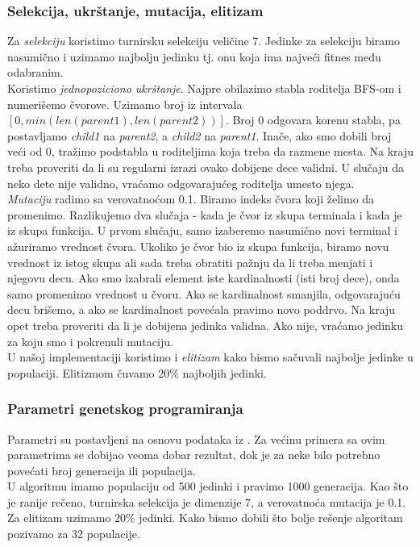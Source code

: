 \documentclass{article}
\begin{document}
\subsubsection{Selekcija, ukrštanje, mutacija, elitizam}
Za \textit{selekciju} koristimo turnirsku selekciju veličine 7. Jedinke
za selekciju biramo nasumično i uzimamo najbolju jedinku tj. onu koja ima najveći fitnes među odabranim. \\
Koristimo \textit{jednopoziciono ukrštanje}. Najpre obilazimo stabla roditelja BFS-om i numerišemo čvorove. Uzimamo broj iz intervala $[0, min(len(parent1), len(parent2))]$. Broj 0 odgovara korenu stabla, pa postavljamo \textit{child1} na \textit{parent2}, a \textit{child2} na \textit{parent1}. Inače, ako smo dobili broj veći od 0, tražimo podstabla u roditeljima koja treba da razmene mesta. Na kraju treba proveriti da li su regularni izrazi ovako dobijene dece validni. U slučaju da neko dete nije validno, vraćamo odgovarajućeg roditelja umesto njega. \\
\textit{Mutaciju} radimo sa verovatnoćom 0.1. Biramo indeks čvora koji želimo da promenimo. Razlikujemo dva slučaja - kada je čvor iz skupa terminala i kada je iz skupa funkcija. U prvom slučaju, samo izaberemo nasumično novi terminal i ažuriramo vrednost čvora.
Ukoliko je čvor bio iz skupa funkcija, biramo novu vrednost iz istog skupa ali sada treba obratiti pažnju da li treba menjati i njegovu decu. Ako smo izabrali element iste kardinalnosti (isti broj dece), onda samo promenimo vrednost u čvoru. Ako se kardinalnost smanjila, odgovarajuću decu brišemo, a ako se kardinalnost povećala pravimo novo poddrvo. Na kraju opet treba proveriti da li je dobijena jedinka validna. Ako nije, vraćamo jedinku za koju smo i pokrenuli mutaciju. \\
U našoj implementaciji koristimo i \textit{elitizam} kako bismo sačuvali najbolje jedinke u populaciji. Elitizmom čuvamo $20\%$ najboljih jedinki.

\subsubsection{Parametri genetskog programiranja}
Parametri su postavljeni na osnovu podataka iz \cite{Bartoli}. Za većinu primera sa ovim parametrima se dobijao veoma dobar rezultat, dok je za neke bilo potrebno povećati broj generacija ili populacija. \\
U algoritmu imamo populaciju od 500 jedinki i pravimo 1000 generacija.
Kao što je ranije rečeno, turnirska selekcija je dimenzije 7, a verovatnoća mutacija je 0.1. Za elitizam uzimamo $20\%$ jedinki.
Kako bismo dobili što bolje rešenje algoritam pozivamo za 32 populacije.
\end{document}
